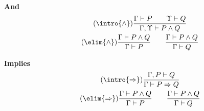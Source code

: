 \textbf{And}
\begin{gather}
    \tag{$\intro{\wedge}$}
    \frac{\Gamma \vdash P\qquad \Upsilon \vdash Q}{\Gamma, \Upsilon \vdash P\wedge Q}\\
    \tag{$\elim{\wedge}$}
    \frac{\Gamma \vdash P\wedge Q}{\Gamma\vdash P}
    \qquad
    \frac{\Gamma \vdash P\wedge Q}{\Gamma\vdash Q}
\end{gather}

\textbf{Implies}
\begin{gather}
    \tag{$\intro{\Rightarrow}$}
    \frac{\Gamma, P \vdash Q}{\Gamma \vdash P\Rightarrow Q}\\
    \tag{$\elim{\Rightarrow}$}
    \frac{\Gamma \vdash P\wedge Q}{\Gamma\vdash P}
    \qquad
    \frac{\Gamma \vdash P\wedge Q}{\Gamma \vdash Q}
\end{gather}